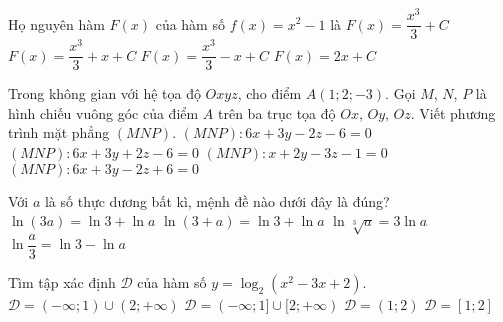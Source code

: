 	\begin{ex}%
		Họ nguyên hàm $F(x)$ của hàm số $f(x)=x^2-1$ là
		\choice
		{$F(x)=\dfrac{x^3}{3}+C$}
		{$F(x)=\dfrac{x^3}{3}+x+C$}
		{\True $F(x)=\dfrac{x^3}{3}-x+C$}
		{$F(x)=2x+C$}
	\end{ex}
	\begin{ex}%
		Trong không gian với hệ tọa độ $Oxyz$, cho điểm $A(1;2;-3)$. Gọi $M$, $N$, $P$ là hình chiếu vuông góc của điểm $A$ trên ba trục tọa độ $Ox$, $Oy$, $Oz$. Viết phương trình mặt phẳng $(MNP)$.
		\choice
		{\True $(MNP)\colon6x+3y-2z-6=0$}
		{$(MNP)\colon6x+3y+2z-6=0$}
		{$(MNP)\colon x+2y-3z-1=0$}
		{$(MNP)\colon6x+3y-2z+6=0$}
	\end{ex}
	\begin{ex}%
		Với $a$ là số thực dương bất kì, mệnh đề nào dưới đây là đúng?
		\choice
		{\True $\ln(3a)=\ln3+\ln a$}
		{$\ln(3+a)=\ln3+\ln a$}
		{$\ln\sqrt[3]{a}=3\ln a$}
		{$\ln\dfrac{a}{3}=\ln3-\ln a$}
	\end{ex}
	\begin{ex}%
		Tìm tập xác định $\mathscr{D}$ của hàm số $y=\log_2(x^2-3x+2)$.
		\choice
		{\True $\mathscr{D}=(-\infty;1)\cup(2;+\infty)$}
		{$\mathscr{D}=(-\infty;1]\cup[2;+\infty)$}
		{$\mathscr{D}=(1;2)$}
		{$\mathscr{D}=[1;2]$}
	\end{ex}
